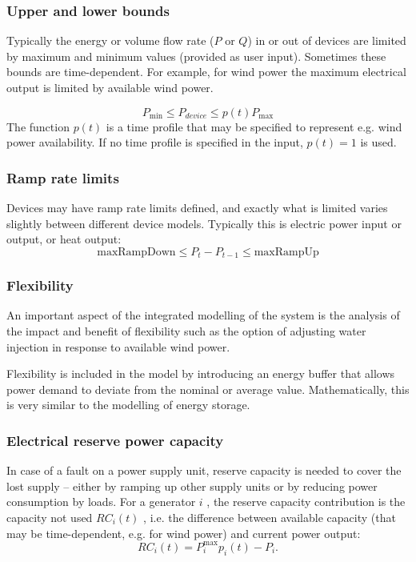 \documentclass[12pt]{article}
\begin{document}
\subsubsection{Upper and lower bounds}

Typically the energy or volume flow rate ($P$ or $Q$) in or out of devices are limited by maximum and minimum values (provided as user input). Sometimes these bounds are time-dependent. For example, for wind power the maximum electrical output is limited by available wind power.

\begin{equation}
	 P_{\min } \leq P_{device} \leq p(t) P_{\max } 
\end{equation}
The function $p(t)$ is a time profile that may be specified to represent e.g. wind power availability. 
If no time profile is specified in the input,  $p(t)=1$  is used.


\subsubsection{Ramp rate limits}
Devices may have ramp rate limits defined, and exactly what is limited varies slightly between different device models.  Typically this is electric power input or output, or heat output:
\begin{equation}
	 \text{maxRampDown} \leq P_{t}-P_{t-1} \leq  \text{maxRampUp}
\end{equation}


\subsubsection{Flexibility}

An important aspect of the integrated modelling of the system is the analysis of the impact and benefit of flexibility such as the option of adjusting water injection in response to available wind power.


Flexibility is included in the model by introducing an energy buffer that allows power demand to deviate from the nominal or average value. Mathematically, this is very similar to the modelling of energy storage. 



\subsubsection{Electrical reserve power capacity}

In case of a fault on a power supply unit, reserve capacity is needed to cover the lost supply – either by ramping up other supply units or by reducing power consumption by loads. For a generator  $i$ , the reserve capacity contribution is the capacity not used  $RC_{i}(t)$ , i.e. the difference between available capacity (that may be time-dependent, e.g. for wind power) and current power output:
\begin{equation}
 	RC_{i}(t) =P_{i}^{\max }p_{i}(t) - P_{i}. 
\end{equation}
\end{document}
